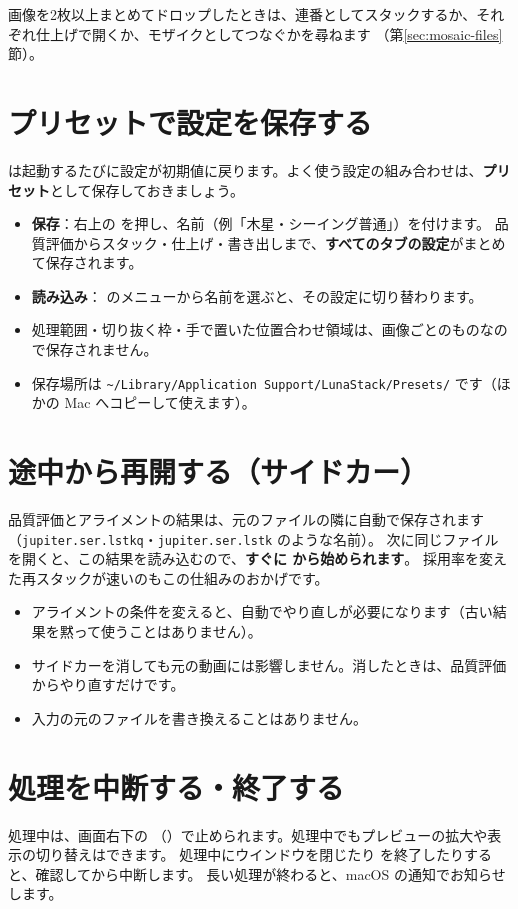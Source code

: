 画像を2枚以上まとめてドロップしたときは、連番としてスタックするか、それぞれ仕上げで開くか、モザイクとしてつなぐかを尋ねます
（第\ref{sec:mosaic-files}節）。

\section{プリセットで設定を保存する}\label{sec:preset}

\LS は起動するたびに設定が初期値に戻ります。よく使う設定の組み合わせは、\textbf{プリセット}として保存しておきましょう。

\begin{itemize}[itemsep=2pt]
  \item \textbf{保存}：右上の  を押し、名前（例「木星・シーイング普通」）を付けます。
        品質評価からスタック・仕上げ・書き出しまで、\textbf{すべてのタブの設定}がまとめて保存されます。
  \item \textbf{読み込み}： のメニューから名前を選ぶと、その設定に切り替わります。
  \item 処理範囲・切り抜く枠・手で置いた位置合わせ領域は、画像ごとのものなので保存されません。
  \item 保存場所は \texttt{\textasciitilde/Library/Application Support/LunaStack/Presets/} です（ほかの Mac へコピーして使えます）。
\end{itemize}

\section{途中から再開する（サイドカー）}\label{sec:sidecar}

品質評価とアライメントの結果は、元のファイルの隣に自動で保存されます（\texttt{jupiter.ser.lstkq}・\texttt{jupiter.ser.lstk} のような名前）。
次に同じファイルを開くと、この結果を読み込むので、\textbf{すぐに  から始められます}。
採用率を変えた再スタックが速いのもこの仕組みのおかげです。

\begin{itemize}[itemsep=2pt]
  \item アライメントの条件を変えると、自動でやり直しが必要になります（古い結果を黙って使うことはありません）。
  \item サイドカーを消しても元の動画には影響しません。消したときは、品質評価からやり直すだけです。
  \item 入力の元のファイルを書き換えることはありません。
\end{itemize}

\section{処理を中断する・終了する}

処理中は、画面右下の （）で止められます。処理中でもプレビューの拡大や表示の切り替えはできます。
処理中にウインドウを閉じたり \LS を終了したりすると、確認してから中断します。
長い処理が終わると、macOS の通知でお知らせします。
